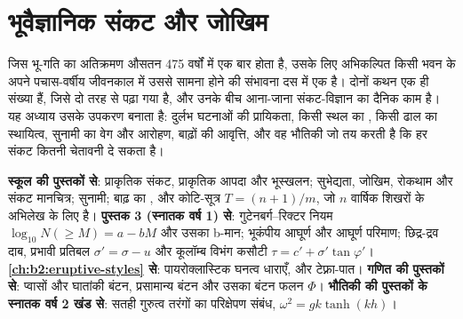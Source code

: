\chapter{भूवैज्ञानिक संकट और जोखिम}\label{ch:b2:geological-hazards}

जिस भू-गति का अतिक्रमण औसतन 475 वर्षों में एक बार होता है, उसके लिए अभिकल्पित किसी भवन के अपने पचास-वर्षीय
जीवनकाल में उससे सामना होने की संभावना दस में एक है। दोनों कथन एक ही संख्या हैं, जिसे दो तरह से
पढ़ा गया है, और उनके बीच आना-जाना संकट-विज्ञान का दैनिक काम है। यह अध्याय
उसके उपकरण बनाता है: दुर्लभ घटनाओं की प्रायिकता, किसी स्थल का , किसी ढाल का
स्थायित्व, सुनामी का वेग और आरोहण, बाढ़ों की आवृत्ति, और वह भौतिकी जो तय करती है कि
हर संकट कितनी चेतावनी दे सकता है।

\begin{recall}
\textbf{स्कूल की पुस्तकों से}: प्राकृतिक संकट, प्राकृतिक आपदा और भूस्खलन; सुभेद्यता,
जोखिम, रोकथाम और संकट मानचित्र; सुनामी; बाढ़ का , और कोटि-सूत्र $T = (n + 1)/m$,
जो $n$ वार्षिक शिखरों के अभिलेख के लिए है। \textbf{पुस्तक 3 (स्नातक वर्ष 1) से}:
गुटेनबर्ग--रिक्टर नियम $\log_{10} N(\geq M) = a - bM$ और उसका b-मान; भूकंपीय आघूर्ण और आघूर्ण
परिमाण; छिद्र-द्रव दाब, प्रभावी प्रतिबल $\sigma' = \sigma - u$ और कूलॉम्ब विभंग
कसौटी $\tau = c' + \sigma' \tan\varphi'$। \textbf{\cref{ch:b2:eruptive-styles} से}: पायरोक्लास्टिक
घनत्व धाराएँ,  और टेफ़्रा-पात। \textbf{गणित की पुस्तकों से}: प्वासों और
घातांकी बंटन, प्रसामान्य बंटन और उसका बंटन फलन $\Phi$।
\textbf{भौतिकी की पुस्तकों के स्नातक वर्ष 2 खंड से}: सतही गुरुत्व तरंगों का परिक्षेपण संबंध,
$\omega^2 = gk\tanh(kh)$।
\end{recall}

